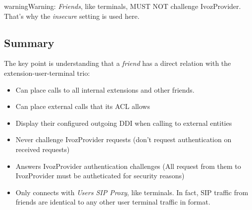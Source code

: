 \documentclass[letterpaper,10pt,english]{sphinxmanual}
\begin{document}
\begin{notice}{warning}{Warning:}
\emph{Friends}, like terminals, MUST NOT challenge IvozProvider. That's
why the \emph{insecure} setting is used here.
\end{notice}


\subsection{Summary}
\label{company/friends:summary}
The key point is understanding that a \emph{friend} has a direct relation with the
extension-user-terminal trio:
\begin{itemize}
\item {} 
Can place calls to all internal extensions and other friends.

\item {} 
Can place external calls that its ACL allows

\item {} 
Display their configured outgoing DDI when calling to external entities

\item {} 
Never challenge IvozProvider requests (don't request authentication on received requests)

\item {} 
Answers IvozProvider authentication challenges (All request from them to
IvozProvider must be autheticated for security reasons)

\item {} 
Only connects with \emph{Users SIP Proxy}, like terminals. In fact, SIP traffic from
friends are identical to any other user terminal traffic in format.

\end{itemize}
\end{document}
